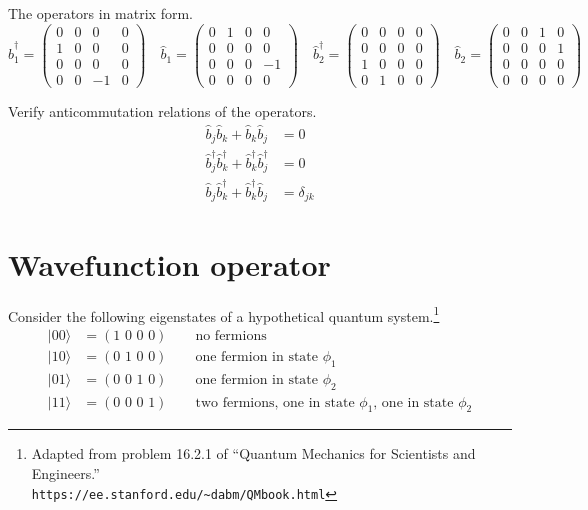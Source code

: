 \documentclass[12pt]{article}
\begin{document}
\noindent
The operators in matrix form.
\begin{equation*}
\hat{b}_1^\dag=\begin{pmatrix}0&0&0&0\\1&0&0&0\\0&0&0&0\\0&0&-1&0\end{pmatrix}
\quad
\hat{b}_1=\begin{pmatrix}0&1&0&0\\0&0&0&0\\0&0&0&-1\\0&0&0&0\end{pmatrix}
\quad
\hat{b}_2^\dag=\begin{pmatrix}0&0&0&0\\0&0&0&0\\1&0&0&0\\0&1&0&0\end{pmatrix}
\quad
\hat{b}_2=\begin{pmatrix}0&0&1&0\\0&0&0&1\\0&0&0&0\\0&0&0&0\end{pmatrix}
\end{equation*}

\noindent
Verify anticommutation relations of the operators.
\begin{align*}
\hat{b}_j\hat{b}_k+\hat{b}_k\hat{b}_j&=0
\\[2ex]
\hat{b}_j^\dag\hat{b}_k^\dag+\hat{b}_k^\dag\hat{b}_j^\dag&=0
\\[2ex]
\hat{b}_j\hat{b}_k^\dag+\hat{b}_k^\dag\hat{b}_j&=\delta_{jk}
\end{align*}

\newpage

\section{Wavefunction operator}
Consider the following eigenstates of a hypothetical quantum system.\footnote{
Adapted from problem 16.2.1 of ``Quantum Mechanics for Scientists and Engineers.''\\
{\tt https://ee.stanford.edu/{\textasciitilde}dabm/QMbook.html}}
\begin{align*}
|00\rangle&=(\text{1 0 0 0})\qquad\text{no fermions}\\
|10\rangle&=(\text{0 1 0 0})\qquad\text{one fermion in state $\phi_1$}\\
|01\rangle&=(\text{0 0 1 0})\qquad\text{one fermion in state $\phi_2$}\\
|11\rangle&=(\text{0 0 0 1})\qquad\text{two fermions, one in state $\phi_1$, one in state $\phi_2$}
\end{align*}
\end{document}
